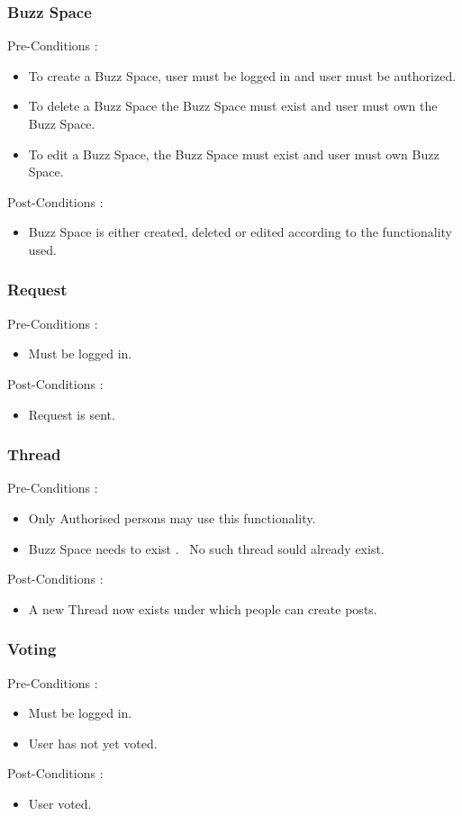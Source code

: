 \documentclass[12pt, oneside]{article}
\begin{document}
			\subsubsection{Buzz Space}
				Pre-Conditions : \begin{itemize}
							\item To create a Buzz Space, user must be logged in and user must be authorized.
							\item To delete a Buzz Space the Buzz Space must exist and user must own the Buzz Space.
							\item To edit a Buzz Space, the Buzz Space must exist and user must own Buzz Space.
						     \end{itemize}
				Post-Conditions : \begin{itemize}
							\item Buzz Space is either created, deleted or edited according to the functionality used.
						     \end{itemize}
			\subsubsection{Request}
				Pre-Conditions : \begin{itemize}
							\item Must be logged in.
						     \end{itemize}
				Post-Conditions : \begin{itemize}
							\item Request is sent.
						     \end{itemize}
			\subsubsection{Thread}
				Pre-Conditions : \begin{itemize}
							\item Only Authorised persons may use this functionality.
							\item Buzz Space needs to exist .
							\ No such thread sould already exist.
						     \end{itemize}
				Post-Conditions : \begin{itemize}
							\item A new Thread now exists under which people can create posts.
						     \end{itemize}
			\subsubsection{Voting}
				Pre-Conditions : \begin{itemize}
							\item Must  be logged in.
							\item User has not yet voted.
						     \end{itemize}
				Post-Conditions : \begin{itemize}
							\item User voted.
						     \end{itemize}
\end{document}
